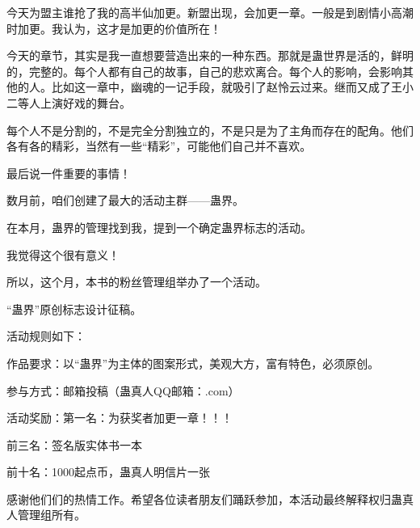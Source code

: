 \begin{this_body} %

今天为盟主谁抢了我的高半仙加更。新盟出现，会加更一章。一般是到剧情小高潮时加更。我认为，这才是加更的价值所在！

今天的章节，其实是我一直想要营造出来的一种东西。那就是蛊世界是活的，鲜明的，完整的。每个人都有自己的故事，自己的悲欢离合。每个人的影响，会影响其他的人。比如这一章中，幽魂的一记手段，就吸引了赵怜云过来。继而又成了王小二等人上演好戏的舞台。

每个人不是分割的，不是完全分割独立的，不是只是为了主角而存在的配角。他们各有各的精彩，当然有一些“精彩”，可能他们自己并不喜欢。

最后说一件重要的事情！

数月前，咱们创建了最大的活动主群——蛊界。

在本月，蛊界的管理找到我，提到一个确定蛊界标志的活动。

我觉得这个很有意义！

所以，这个月，本书的粉丝管理组举办了一个活动。

“蛊界”原创标志设计征稿。

活动规则如下：

作品要求：以“蛊界”为主体的图案形式，美观大方，富有特色，必须原创。

参与方式：邮箱投稿（蛊真人QQ邮箱：.com）

活动奖励：第一名：为获奖者加更一章！！！

前三名：签名版实体书一本

前十名：1000起点币，蛊真人明信片一张

感谢他们们的热情工作。希望各位读者朋友们踊跃参加，本活动最终解释权归蛊真人管理组所有。

\end{this_body}

